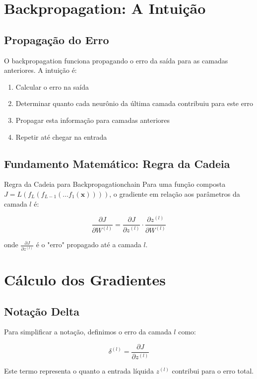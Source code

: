 \documentclass[a4paper,12pt]{article}
\newcommand{\grad}[2]{\frac{\partial #1}{\partial #2}}
\begin{document}
\section{Backpropagation: A Intuição}

\subsection{Propagação do Erro}

O backpropagation funciona propagando o erro da saída para as camadas anteriores. A intuição é:

\begin{enumerate}
    \item Calcular o erro na saída
    \item Determinar quanto cada neurônio da última camada contribuiu para este erro
    \item Propagar esta informação para camadas anteriores
    \item Repetir até chegar na entrada
\end{enumerate}

\subsection{Fundamento Matemático: Regra da Cadeia}

\begin{teorema}{Regra da Cadeia para Backpropagation}{chain}
Para uma função composta $J = L(f_L(f_{L-1}(...f_1(\mathbf{x}))))$, o gradiente em relação aos parâmetros da camada $l$ é:

$$\grad{J}{W^{(l)}} = \grad{J}{z^{(l)}} \cdot \grad{z^{(l)}}{W^{(l)}}$$

onde $\grad{J}{z^{(l)}}$ é o "erro" propagado até a camada $l$.
\end{teorema}

\section{Cálculo dos Gradientes}

\subsection{Notação Delta}

Para simplificar a notação, definimos o erro da camada $l$ como:

$$\delta^{(l)} = \grad{J}{z^{(l)}}$$

Este termo representa o quanto a entrada líquida $z^{(l)}$ contribui para o erro total.
\end{document}
